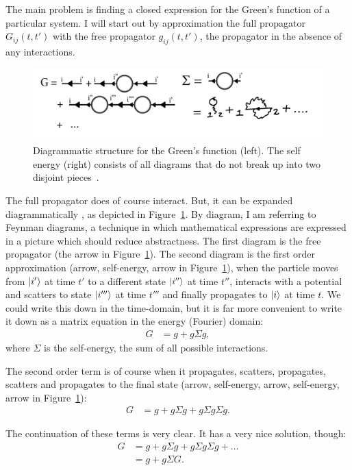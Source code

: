 The main problem is finding a closed expression for the Green's function of a particular system. I will start out by approximation the full propagator $G_{ij}(t,t')$ with the free propagator $g_{ij}(t,t')$, the propagator in the absence of any interactions. 

\begin{figure}[!bt]
    \centering
    \includegraphics[width=\textwidth]{pdf/diagrams.pdf}
    \caption{Diagrammatic structure for the Green's function (left). The self energy (right) consists of all diagrams that do not break up into two disjoint pieces~\cite{leeuwen}.}
    \label{fig:firstorderdiagram}
\end{figure}
The full propagator does of course interact. But, it can be expanded diagrammatically \cite{mattuck}, as depicted in Figure~\ref{fig:firstorderdiagram}. By diagram, I am referring to Feynman diagrams, a technique in which mathematical expressions are expressed in a picture which should reduce abstractness. The first diagram is the free propagator (the arrow in Figure~\ref{fig:firstorderdiagram}). The second diagram is the first order approximation (arrow, self-energy, arrow in Figure~\ref{fig:firstorderdiagram}), when the particle moves from $\ket{i'}$ at time $t'$ to a different state $\ket{i''}$ at time $t''$, interacts with a potential and scatters to state $\ket{i'''}$ at time $t'''$ and finally propagates to $\ket{i}$ at time $t$. We could write this down in the time-domain, but it is far more convenient to write it down as a matrix equation in the energy (Fourier) domain:
\begin{align*}
G &= g + g \Sigma g,
\end{align*}
where $\Sigma$ is the self-energy, the sum of all possible interactions.

The second order term is of course when it propagates, scatters, propagates, scatters and propagates to the final state (arrow, self-energy, arrow, self-energy, arrow in Figure~\ref{fig:firstorderdiagram}):
\begin{align*}
G &= g + g \Sigma g + g \Sigma g \Sigma g.
\end{align*}

The continuation of these terms is very clear. It has a very nice solution, though:
\begin{align}
G &= g + g \Sigma g + g \Sigma g \Sigma g+ \ldots \nonumber\\
&= g + g \Sigma G. \label{eq:dyson}
\end{align}

